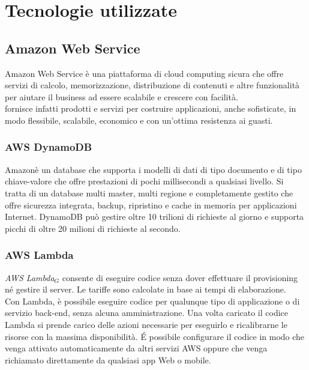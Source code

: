 \chapter{Tecnologie utilizzate}
\label{Tecnologie}
\section{Amazon Web Service}
Amazon Web Service è una piattaforma di cloud computing sicura che offre servizi di calcolo, memorizzazione, distribuzione di contenuti e altre funzionalità per aiutare il business ad essere scalabile e crescere con facilità.\\ fornisce infatti prodotti e servizi per costruire applicazioni, anche sofisticate, in modo flessibile, scalabile, economico e  con un'ottima resistenza ai guasti. 
\subsection{AWS DynamoDB}
Amazonè un database che supporta i modelli di dati di tipo documento e di tipo chiave-valore che offre prestazioni di pochi millisecondi a qualsiasi livello. Si tratta di un database multi master, multi regione e completamente gestito che offre sicurezza integrata, backup, ripristino e cache in memoria per applicazioni Internet. DynamoDB può gestire oltre 10 trilioni di richieste al giorno e supporta picchi di oltre 20 milioni di richieste al secondo. 
\subsection{AWS Lambda}
\textit{AWS Lambda$_{G}$} consente di eseguire codice senza dover effettuare il provisioning né gestire il server. Le tariffe sono calcolate in base ai tempi di elaborazione.\\ 
Con Lambda, è possibile eseguire codice per qualunque tipo di applicazione o di servizio back-end, senza alcuna amministrazione. Una volta caricato il codice Lambda si prende carico delle azioni necessarie per eseguirlo e ricalibrarne le risorse con la massima disponibilità. \'E possibile configurare il codice in modo che venga attivato automaticamente da altri servizi AWS oppure che venga richiamato direttamente da qualsiasi app Web o mobile.
